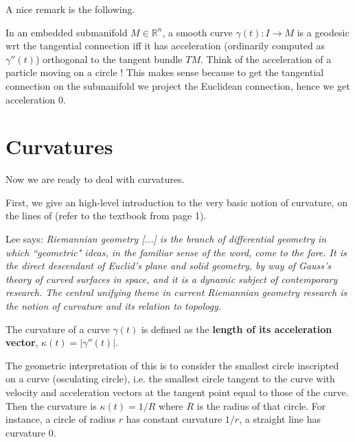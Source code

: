 \documentclass[a4paper,12pt,reqno]{amsbook}
\theoremstyle{definition} %
\newcommand{\1}{\mathbbm{1}}
\newcommand{\R}{\ensuremath{\mathbb{R}}}
\theoremstyle{plain}
\theoremstyle{remark}
\begin{document}
A nice remark is the following. 
\begin{example}
    In an embedded submanifold $M \in \R^n$, a smooth curve $\gamma(t):I\to M$ is a geodesic wrt the tangential connection iff it has acceleration (ordinarily computed as $\gamma ''(t)$) orthogonal to the tangent bundle $TM$. Think of the acceleration of a particle moving on a circle !  
This makes sense because to get the tangential connection on the submanifold we project the Euclidean connection, hence we get acceleration 0. 
\end{example}


\section{Curvatures}
Now we are ready to deal with curvatures.

First, we give an high-level introduction to the very basic notion of curvature, on the lines of \cite{lee2018riemann} (refer to the textbook from page 1).

Lee says: \textit{Riemannian geometry [...] is the branch of differential geometry in
which ``geometric" ideas, in the familiar sense of the word, come to the fore. It is the
direct descendant of Euclid’s plane and solid geometry, by way of Gauss’s theory of
curved surfaces in space, and it is a dynamic subject of contemporary research. The central unifying theme in current Riemannian geometry research is the
notion of curvature and its relation to topology.} \cite{lee2018riemann}

The curvature of a curve $\gamma(t)$ is defined as the \textbf{length of its acceleration vector}, $\kappa(t)=|\gamma''(t)|$. 

The geometric interpretation of this is to consider the smallest circle inscripted on a curve (osculating circle), i.e. the smallest circle tangent to the curve with velocity and acceleration vectors at the tangent point equal to those of the curve. Then the curvature is $\kappa(t)=1/R$ where $R$ is the radius of that circle. For instance, a circle of radius $r$ has constant curvature $1/r$, a straight line has curvature 0.
\end{document}
